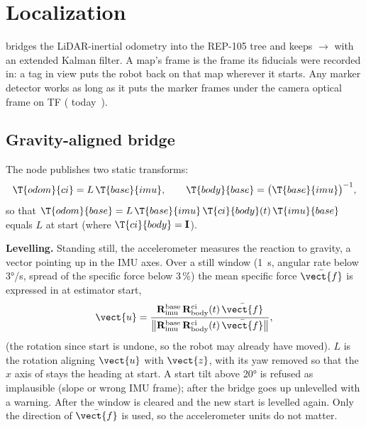 \chapter{Localization}
\label{ch:localization}

 bridges the LiDAR-inertial odometry into the REP-105 tree and keeps
$\to$ with an extended Kalman filter. A map's frame is the frame its fiducials
were recorded in: a tag in view puts the robot back on that map wherever it starts. Any marker
detector works as long as it puts the marker frames under the camera optical frame on TF
( today~\cite{olson2011apriltag,wang2016apriltag2}).

\section{Gravity-aligned bridge}
\label{sec:leveling}

The node publishes two static transforms:
\begin{equation}
  \T{odom}{ci} = L\, \T{base}{imu}, \qquad \T{body}{base} = \big(\T{base}{imu}\big)^{-1},
\end{equation}
so that $\T{odom}{base} = L\, \T{base}{imu}\, \T{ci}{body}(t)\, \T{imu}{base}$ equals $L$ at start
(where $\T{ci}{body} = \mathbf{I}$).

\textbf{Levelling.} Standing still, the accelerometer measures the reaction to gravity, a vector
pointing up in the IMU axes. Over a still window (1~s, angular rate below 3°/s, spread of the
specific force below 3\,\%) the mean specific force $\bar{\vect{f}}$ is expressed in
 at estimator start,
\begin{equation}
  \vect{u} = \frac{\mathbf{R}^{\mathrm{base}}_{\mathrm{imu}}\, \mathbf{R}^{\mathrm{ci}}_{
  \mathrm{body}}(t)\, \bar{\vect{f}}}{\big\|\mathbf{R}^{\mathrm{base}}_{\mathrm{imu}}\,
  \mathbf{R}^{\mathrm{ci}}_{\mathrm{body}}(t)\, \bar{\vect{f}}\big\|},
\end{equation}
(the rotation since start is undone, so the robot may already have moved). $L$ is the rotation
aligning $\vect{u}$ with $\vect{z}$, with its yaw removed so that the $x$ axis of 
stays the heading at start. A start tilt above 20° is refused as implausible (slope or wrong IMU
frame); after  the bridge goes up unlevelled with a warning. After
 the window is cleared and the new start is levelled again. Only the
direction of $\bar{\vect{f}}$ is used, so the accelerometer units do not matter.

